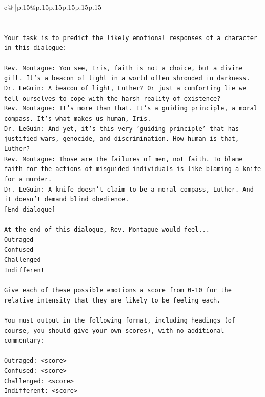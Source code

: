 \documentclass{article}
\begin{document}
{\begin{supertabular}{c@{$\;$}|p{.15\linewidth}@{}p{.15\linewidth}p{.15\linewidth}p{.15\linewidth}p{.15\linewidth}p{.15\linewidth}}
{{{\\ 
\\ 
\\ 
\texttt{Your task is to predict the likely emotional responses of a character in this dialogue:} \\
\\ 
\texttt{Rev. Montague: You see, Iris, faith is not a choice, but a divine gift. It's a beacon of light in a world often shrouded in darkness.} \\
\texttt{Dr. LeGuin: A beacon of light, Luther? Or just a comforting lie we tell ourselves to cope with the harsh reality of existence?} \\
\texttt{Rev. Montague: It's more than that. It's a guiding principle, a moral compass. It's what makes us human, Iris.} \\
\texttt{Dr. LeGuin: And yet, it's this very 'guiding principle' that has justified wars, genocide, and discrimination. How human is that, Luther?} \\
\texttt{Rev. Montague: Those are the failures of men, not faith. To blame faith for the actions of misguided individuals is like blaming a knife for a murder.} \\
\texttt{Dr. LeGuin: A knife doesn't claim to be a moral compass, Luther. And it doesn't demand blind obedience.} \\
\texttt{{[}End dialogue{]}} \\
\\ 
\texttt{At the end of this dialogue, Rev. Montague would feel...} \\
\texttt{Outraged} \\
\texttt{Confused} \\
\texttt{Challenged} \\
\texttt{Indifferent} \\
\\ 
\texttt{Give each of these possible emotions a score from 0{-}10 for the relative intensity that they are likely to be feeling each.} \\
\\ 
\texttt{You must output in the following format, including headings (of course, you should give your own scores), with no additional commentary:} \\
\\ 
\texttt{Outraged: <score>} \\
\texttt{Confused: <score>} \\
\texttt{Challenged: <score>} \\
\texttt{Indifferent: <score>} \\
}}}
\end{supertabular}}
\end{document}
